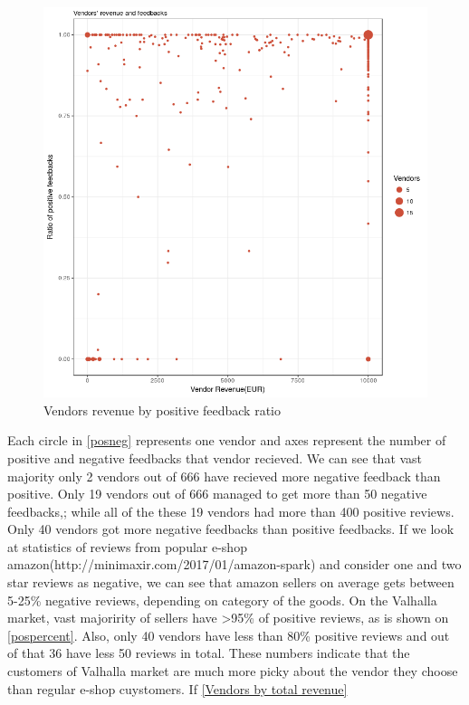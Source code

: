 \documentclass[
  digital, %
  table,   %
  lof,     %
  lot,     %
  oneside
]{fithesis3}
\begin{document}
\begin{figure}[!htb]
    \centering
    \includegraphics[scale=0.4]{revpos}
    \caption{Vendors revenue by positive feedback ratio}
    \label{revpos}
\end{figure}

Each circle in \ref{posneg} represents one vendor and axes represent
the number of positive and negative feedbacks that vendor recieved. 
We can see that vast majority only 2 vendors out of 666 have recieved more
negative feedback than positive.
Only 19 vendors out of 666 managed to get more than 50 negative feedbacks,;
while all of the these 19 vendors had more
 than 400 positive reviews.
Only 40 vendors got more negative feedbacks than positive feedbacks.
 If we look at statistics of reviews from popular e-shop amazon(http://minimaxir.com/2017/01/amazon-spark)
 and consider one and two star reviews as negative, we can see that amazon sellers on
 average gets between 5-25\% negative reviews, depending on category of the goods.
 On the Valhalla market, vast majoririty of sellers have >95\% of positive reviews, as is shown on \ref{pospercent}.
 Also, only 40 vendors have less than 80\% positive reviews and out of that 36 have less 50 reviews in total.
 These numbers indicate that the customers of Valhalla market
 are much more picky about the vendor they choose than regular e-shop cuystomers. If \ref{Vendors by total revenue}
  
\end{document}
